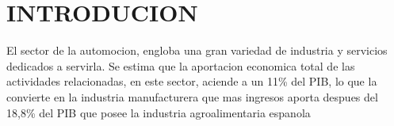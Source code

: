 
\section{INTRODUCION}

El sector de la automocion,
engloba una gran variedad de industria y servicios dedicados a servirla.
Se estima que la aportacion economica total de las actividades relacionadas,
en este sector, aciende a un 11\% del PIB,
lo que la convierte en la industria manufacturera que mas ingresos aporta
despues  del 18,8\% del PIB que posee la industria agroalimentaria espanola

